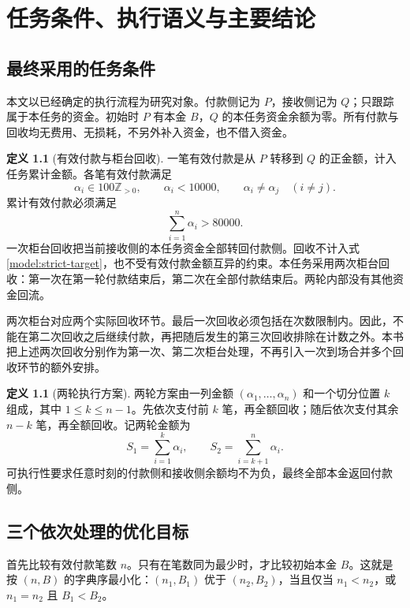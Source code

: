 \documentclass[UTF8,a4paper]{ctexbook}
\theoremstyle{definition}
\newtheorem{definition}[theorem]{定义}
\numberwithin{equation}{chapter}
\newcommand{\Z}{\mathbb{Z}}
\newcommand{\1}{\mathbf{1}}
\begin{document}
\chapter{任务条件、执行语义与主要结论}\label{model:chapter}

\section{最终采用的任务条件}
本文以已经确定的执行流程为研究对象。付款侧记为 $P$，接收侧记为 $Q$；只跟踪属于本任务的资金。初始时 $P$ 有本金 $B$，$Q$ 的本任务资金余额为零。所有付款与回收均无费用、无损耗，不另外补入资金，也不借入资金。

\begin{definition}[有效付款与柜台回收]\label{model:rules}
一笔有效付款是从 $P$ 转移到 $Q$ 的正金额，计入任务累计金额。各笔有效付款满足
\[
\alpha_i\in100\Z_{>0},\qquad \alpha_i<10000,
\qquad \alpha_i\ne\alpha_j\quad(i\ne j).
\]
累计有效付款必须满足
\begin{equation}\label{model:strict-target}
\sum_{i=1}^{n}\alpha_i>80000.
\end{equation}
一次柜台回收把当前接收侧的本任务资金全部转回付款侧。回收不计入式\eqref{model:strict-target}，也不受有效付款金额互异的约束。本任务采用两次柜台回收：第一次在第一轮付款结束后，第二次在全部付款结束后。两轮内部没有其他资金回流。
\end{definition}

两次柜台对应两个实际回收环节。最后一次回收必须包括在次数限制内。因此，不能在第二次回收之后继续付款，再把随后发生的第三次回收排除在计数之外。本书把上述两次回收分别作为第一次、第二次柜台处理，不再引入一次到场合并多个回收环节的额外安排。

\begin{definition}[两轮执行方案]\label{model:plan}
两轮方案由一列金额 $(\alpha_1,\ldots,\alpha_n)$ 和一个切分位置 $k$ 组成，其中 $1\le k\le n-1$。先依次支付前 $k$ 笔，再全额回收；随后依次支付其余 $n-k$ 笔，再全额回收。记两轮金额为
\[
S_1=\sum_{i=1}^{k}\alpha_i,
\qquad
S_2=\sum_{i=k+1}^{n}\alpha_i.
\]
可执行性要求任意时刻的付款侧和接收侧余额均不为负，最终全部本金返回付款侧。
\end{definition}

\section{三个依次处理的优化目标}
首先比较有效付款笔数 $n$。只有在笔数同为最少时，才比较初始本金 $B$。这就是按 $(n,B)$ 的字典序最小化：$(n_1,B_1)$ 优于 $(n_2,B_2)$，当且仅当 $n_1<n_2$，或 $n_1=n_2$ 且 $B_1<B_2$。
\end{document}

